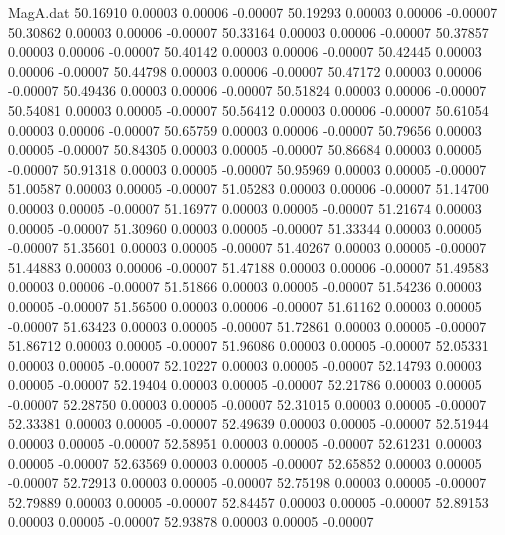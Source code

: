 \begin{filecontents}{MagA.dat}
  50.16910    0.00003    0.00006   -0.00007
  50.19293    0.00003    0.00006   -0.00007
  50.30862    0.00003    0.00006   -0.00007
  50.33164    0.00003    0.00006   -0.00007
  50.37857    0.00003    0.00006   -0.00007
  50.40142    0.00003    0.00006   -0.00007
  50.42445    0.00003    0.00006   -0.00007
  50.44798    0.00003    0.00006   -0.00007
  50.47172    0.00003    0.00006   -0.00007
  50.49436    0.00003    0.00006   -0.00007
  50.51824    0.00003    0.00006   -0.00007
  50.54081    0.00003    0.00005   -0.00007
  50.56412    0.00003    0.00006   -0.00007
  50.61054    0.00003    0.00006   -0.00007
  50.65759    0.00003    0.00006   -0.00007
  50.79656    0.00003    0.00005   -0.00007
  50.84305    0.00003    0.00005   -0.00007
  50.86684    0.00003    0.00005   -0.00007
  50.91318    0.00003    0.00005   -0.00007
  50.95969    0.00003    0.00005   -0.00007
  51.00587    0.00003    0.00005   -0.00007
  51.05283    0.00003    0.00006   -0.00007
  51.14700    0.00003    0.00005   -0.00007
  51.16977    0.00003    0.00005   -0.00007
  51.21674    0.00003    0.00005   -0.00007
  51.30960    0.00003    0.00005   -0.00007
  51.33344    0.00003    0.00005   -0.00007
  51.35601    0.00003    0.00005   -0.00007
  51.40267    0.00003    0.00005   -0.00007
  51.44883    0.00003    0.00006   -0.00007
  51.47188    0.00003    0.00006   -0.00007
  51.49583    0.00003    0.00006   -0.00007
  51.51866    0.00003    0.00005   -0.00007
  51.54236    0.00003    0.00005   -0.00007
  51.56500    0.00003    0.00006   -0.00007
  51.61162    0.00003    0.00005   -0.00007
  51.63423    0.00003    0.00005   -0.00007
  51.72861    0.00003    0.00005   -0.00007
  51.86712    0.00003    0.00005   -0.00007
  51.96086    0.00003    0.00005   -0.00007
  52.05331    0.00003    0.00005   -0.00007
  52.10227    0.00003    0.00005   -0.00007
  52.14793    0.00003    0.00005   -0.00007
  52.19404    0.00003    0.00005   -0.00007
  52.21786    0.00003    0.00005   -0.00007
  52.28750    0.00003    0.00005   -0.00007
  52.31015    0.00003    0.00005   -0.00007
  52.33381    0.00003    0.00005   -0.00007
  52.49639    0.00003    0.00005   -0.00007
  52.51944    0.00003    0.00005   -0.00007
  52.58951    0.00003    0.00005   -0.00007
  52.61231    0.00003    0.00005   -0.00007
  52.63569    0.00003    0.00005   -0.00007
  52.65852    0.00003    0.00005   -0.00007
  52.72913    0.00003    0.00005   -0.00007
  52.75198    0.00003    0.00005   -0.00007
  52.79889    0.00003    0.00005   -0.00007
  52.84457    0.00003    0.00005   -0.00007
  52.89153    0.00003    0.00005   -0.00007
  52.93878    0.00003    0.00005   -0.00007

\end{filecontents}
